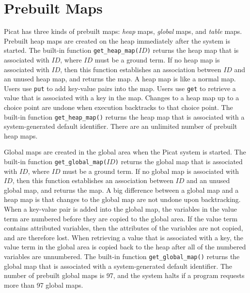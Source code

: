 \section{\label{prebuiltmaps}Prebuilt Maps}
Picat has three kinds of prebuilt maps: {\it heap} maps, {\it global} maps, and {\it table} maps. Prebuilt heap maps  are created on the heap immediately after the system is started. The built-in function \texttt{get\_heap\_map($ID$)} returns the heap map that is associated with $ID$, where $ID$ must be a ground term. If no heap map is associated with $ID$, then this function establishes an association between $ID$ and an unused heap map, and returns the map. A heap map is like a normal map. Users use \texttt{put} to add key-value pairs into the map. Users use \texttt{get} to retrieve a value that is associated with a key in the map. Changes to a heap map up to a choice point are undone when execution backtracks to that choice point. The built-in function \texttt{get\_heap\_map()} returns the heap map that is associated with a system-generated default identifier. There are an unlimited number of prebuilt heap maps.

Global maps  are created in the global area when the Picat system is started. The built-in function \texttt{get\_global\_map($ID$)} returns the global map that is associated with $ID$, where $ID$ must be a ground term. If no global map is associated with $ID$, then this function establishes an association between $ID$ and an unused global map, and returns the map. A big difference between a global map and a heap map is that changes to the global map are not undone upon backtracking. When a key-value pair is added into the global map, the variables in the value term are numbered before they are copied to the global area. If the value term contains attributed variables, then the attributes of the variables are not copied, and are therefore lost. When retrieving a value that is associated with a key, the value term in the global area is copied back to the heap after all of the numbered variables are unnumbered. The built-in function \texttt{get\_global\_map()} returns the global map that is associated with a system-generated default identifier. The number of prebuilt global maps is 97, and the system halts if a program requests more than 97 global maps.

